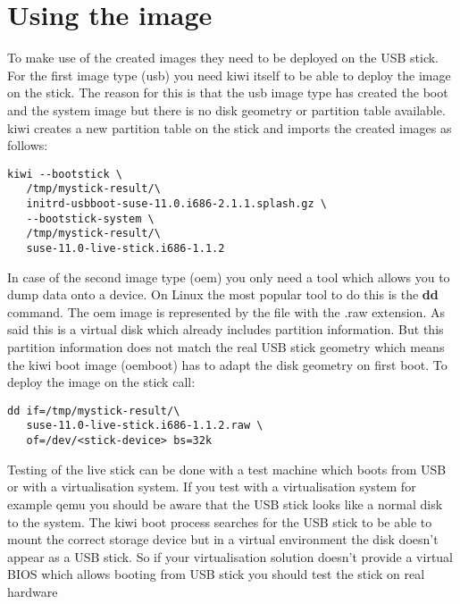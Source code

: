\section{Using the image}

To make use of the created images they need to be deployed on the
USB stick. For the first image type (usb) you need kiwi itself to
be able to deploy the image on the stick. The reason for this is
that the usb image type has created the boot and the system image
but there is no disk geometry or partition table available. kiwi
creates a new partition table on the stick and imports the created
images as follows:

\begin{Command}{13cm}
\begin{verbatim}
kiwi --bootstick \
   /tmp/mystick-result/\
   initrd-usbboot-suse-11.0.i686-2.1.1.splash.gz \
   --bootstick-system \
   /tmp/mystick-result/\
   suse-11.0-live-stick.i686-1.1.2
\end{verbatim}
\end{Command}

In case of the second image type (oem) you only need a tool which allows
you to dump data onto a device. On Linux the most popular tool to do this
is the \textbf{dd} command. The oem image is represented by the file
with the .raw extension. As said this is a virtual disk which already
includes partition information. But this partition information does
not match the real USB stick geometry which means the kiwi boot image
(oemboot) has to adapt the disk geometry on first boot. To deploy the
image on the stick call:

\begin{Command}{13cm}
\begin{verbatim}
dd if=/tmp/mystick-result/\
   suse-11.0-live-stick.i686-1.1.2.raw \
   of=/dev/<stick-device> bs=32k
\end{verbatim}
\end{Command}

Testing of the live stick can be done with a test machine which boots from
USB or with a virtualisation system. If you test with a virtualisation
system for example qemu you should be aware that the USB stick looks like
a normal disk to the system. The kiwi boot process searches for the USB
stick to be able to mount the correct storage device but in a virtual
environment the disk doesn't appear as a USB stick. So if your
virtualisation solution doesn't provide a virtual BIOS which allows booting
from USB stick you should test the stick on real hardware

